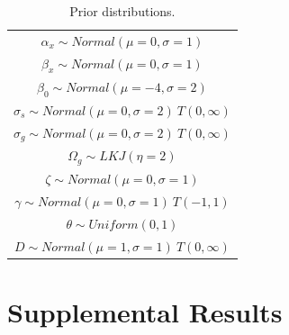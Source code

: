 \documentclass[preprint,final,times,12pt,3p]{elsarticle}
\begin{document}
\begin{table}[ht]
	\centering
	\begin{tabular}{c}
		\hline
		$\alpha_x \sim Normal(\mu=0, \sigma=1)$ \\
		$\beta_x \sim Normal(\mu=0, \sigma=1)$ \\
		$\beta_0 \sim Normal(\mu=-4, \sigma=2)$ \\
		$\sigma_s \sim Normal(\mu=0, \sigma=2) \ T(0,\infty)$\\
		$\sigma_g \sim Normal(\mu=0, \sigma=2) \ T(0,\infty)$\\
		$\Omega_g \sim LKJ(\eta=2)$ \\
		$\zeta \sim Normal(\mu=0, \sigma=1)$\\
		$\gamma \sim Normal(\mu=0, \sigma=1) \ T(-1,1)$\\
		$\theta \sim Uniform(0,1)$ \\
		$D \sim Normal(\mu=1, \sigma=1) \ T(0,\infty)$ \\
		\hline
	\end{tabular}
	\caption{\label{table:priors} Prior distributions. }
\end{table}



\newpage

\lstset{basicstyle=\scriptsize}






\newpage

\section{Supplemental Results}
\end{document}
